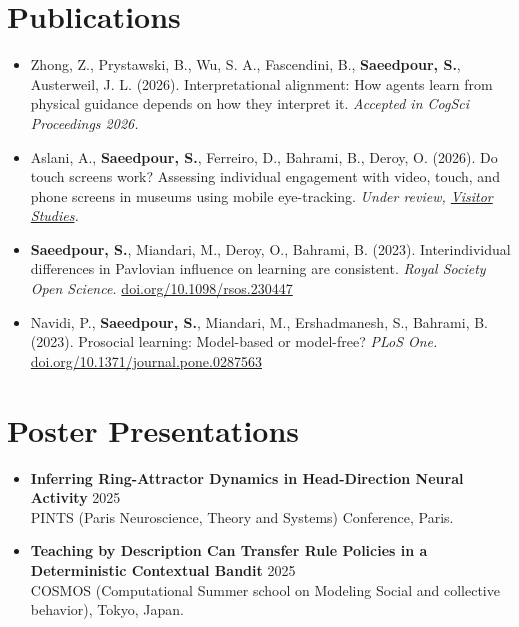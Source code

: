 \documentclass[a4paper,10pt]{article}
\begin{document}
\section{Publications}
\begin{itemize}[leftmargin=*, itemsep=2pt, topsep=1pt]

  \item Zhong, Z., Prystawski, B., Wu, S. A., Fascendini, B., \textbf{Saeedpour, S.}, Austerweil, J. L. (2026). Interpretational alignment: How agents learn from physical guidance depends on how they interpret it. \textit{Accepted in CogSci Proceedings 2026.}

  \item Aslani, A., \textbf{Saeedpour, S.}, Ferreiro, D., Bahrami, B., Deroy, O. (2026). Do touch screens work? Assessing individual engagement with video, touch, and phone screens in museums using mobile eye-tracking. \textit{Under review, \href{https://en.wikipedia.org/wiki/Visitor_Studies_(journal)}{Visitor Studies}.}

  \item \textbf{Saeedpour, S.}, Miandari, M., Deroy, O., Bahrami, B. (2023). Interindividual differences in Pavlovian influence on learning are consistent. \textit{Royal Society Open Science.} \href{https://royalsocietypublishing.org/doi/10.1098/rsos.230447}{doi.org/10.1098/rsos.230447}

  \item Navidi, P., \textbf{Saeedpour, S.}, Miandari, M., Ershadmanesh, S., Bahrami, B. (2023). Prosocial learning: Model-based or model-free? \textit{PLoS One.} \href{https://journals.plos.org/plosone/article?id=10.1371/journal.pone.0287563}{doi.org/10.1371/journal.pone.0287563}

\end{itemize}

\section{Poster Presentations}
\begin{itemize}[leftmargin=*, itemsep=2pt, topsep=1pt]

  \item \textbf{Inferring Ring-Attractor Dynamics in Head-Direction Neural Activity} \hfill \textcolor{dateColor}{2025}\\
  \small PINTS (Paris Neuroscience, Theory and Systems) Conference, Paris.\normalsize

  \item \textbf{Teaching by Description Can Transfer Rule Policies in a Deterministic Contextual Bandit} \hfill \textcolor{dateColor}{2025}\\
  \small COSMOS (Computational Summer school on Modeling Social and collective behavior), Tokyo, Japan.\normalsize

\end{itemize}
\end{document}
